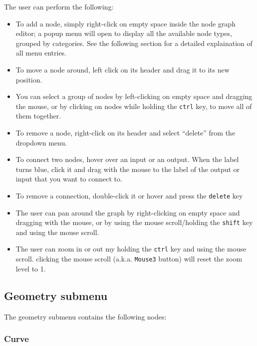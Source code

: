 The user can perform the following:
\begin{itemize}
    \item To add a node, simply right-click on empty space inside the node graph editor;
            a popup menu will open to display all the available node types, grouped by categories.
            See the following section for a detailed explaination of all menu entries.

    \item To move a node around, left click on its header and drag it to its new position.

    \item You can select a group of nodes by left-clicking on empty space and dragging the mouse,
            or by clicking on nodes while holding the \texttt{ctrl} key, to move all of them together.

    \item To remove a node, right-click on its header and select ``delete'' from the dropdown menu.

    \item To connect two nodes, hover over an input or an output. When the label turns blue, click it
            and drag with the mouse to the label of the output or input that you want to connect to. 

    \item To remove a connection, double-click it or hover and press the \texttt{delete} key

    \item The user can pan around the graph by right-clicking on empty space and dragging with the mouse,
            or by using the mouse scroll/holding the \texttt{shift} key and using the mouse scroll.

    \item The user can zoom in or out my holding the \texttt{ctrl} key and using the mouse scroll.
        clicking the mouse scroll (a.k.a. \texttt{Mouse3} button) will reset the zoom level to 1.

\end{itemize}

\subsection{Geometry submenu}
The geometry submenu contains the following nodes:

\subsubsection{Curve}

